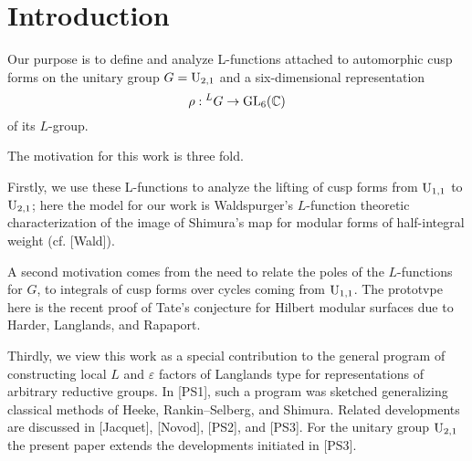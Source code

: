\section*{Introduction}
\label{sec:intro}

Our purpose is to define and analyze L-functions attached to automorphic
cusp forms on the unitary group $G = \mathrm{U}_{2, 1}$ and a six-dimensional representation
\[
    \rho: {}^L G \to \mathrm{GL}_6(\mathbb{C})
\]
of its $L$-group.

The motivation for this work is three fold.


Firstly, we use these L-functions to analyze the lifting of cusp forms
from $\mathrm{U}_{1, 1}$ to $\mathrm{U}_{2, 1}$; here the model for our work is Waldspurger's $L$-function theoretic characterization of the image of Shimura's map for modular forms of half-integral weight (cf. [Wald]).

A second motivation comes from the need to relate the poles of the $L$-functions for $G$, to integrals of cusp forms over cycles coming from $\mathrm{U}_{1, 1}$.
The prototvpe here is the recent proof of Tate's conjecture for Hilbert modular surfaces due to Harder, Langlands, and Rapaport.

Thirdly, we view this work as a special contribution to the general program of constructing local $L$ and $\varepsilon$ factors of Langlands type for representations of arbitrary reductive groups.
In [PS1], such a program was sketched generalizing classical methods of Heeke, Rankin--Selberg, and Shimura.
Related developments are discussed in [Jacquet], [Novod], [PS2], and [PS3].
For the unitary group $\mathrm{U}_{2, 1}$ the present paper extends the developments initiated in [PS3].